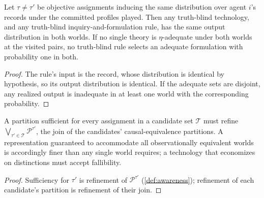 \begin{theorem}
\label{thm:nonidentification}
Let $\tau\neq\tau'$ be objective assignments inducing the same distribution
over agent $i$'s records under the committed profiles played.  Then any
truth-blind technology, and any truth-blind inquiry-and-formulation rule,
has the same output distribution in both worlds.  If no single theory is
$\eta$-adequate under both worlds at the visited pairs, no truth-blind rule
selects an adequate formulation with probability one in both.
\end{theorem}

\begin{proof}
The rule's input is the record, whose distribution is identical by
hypothesis, so its output distribution is identical.  If the adequate sets
are disjoint, any realized output is inadequate in at least one world with
the corresponding probability.
\end{proof}

\begin{proposition}
\label{prop:robust-sufficiency}
A partition sufficient for every assignment in a candidate set $\mathcal T$
must refine $\bigvee_{\tau'\in\mathcal T}\mathcal P^{\tau'}$, the join of the
candidates' causal-equivalence partitions.  A representation guaranteed to
accommodate all observationally equivalent worlds is accordingly finer than
any single world requires; a technology that economizes on distinctions must
accept fallibility.
\end{proposition}

\begin{proof}
Sufficiency for $\tau'$ is refinement of $\mathcal P^{\tau'}$
(\cref{def:awareness}); refinement of each candidate's partition is
refinement of their join.
\end{proof}

